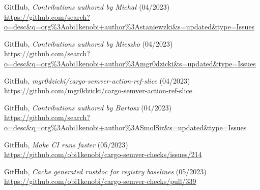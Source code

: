 \documentclass[licencjacka,en]{pracamgr}
\begin{document}
\begin{thebibliography}{99}
 GitHub,
	\textit{Contributions authored by Michał} (04/2023) \\
	\url{https://github.com/search?o=desc&q=org%3Aobi1kenobi+author%3Astaniewzki&s=updated&type=Issues}

 GitHub,
	\textit{Contributions authored by Mieszko} (04/2023) \\
	\url{https://github.com/search?o=desc&q=org%3Aobi1kenobi+author%3Amgr0dzicki&s=updated&type=Issues}

 GitHub,
	\textit{mgr0dzicki/cargo-semver-action-ref-slice} (04/2023) \\
	\url{https://github.com/mgr0dzicki/cargo-semver-action-ref-slice}

 GitHub,
	\textit{Contributions authored by Bartosz} (04/2023) \\
	\url{https://github.com/search?o=desc&q=org%3Aobi1kenobi+author%3ASmolSir&s=updated&type=Issues}



 GitHub,
	\textit{Make CI runs faster} (05/2023) \\
	\url{https://github.com/obi1kenobi/cargo-semver-checks/issues/214}

 GitHub,
	\textit{Cache generated rustdoc for registry baselines} (05/2023) \\
	\url{https://github.com/obi1kenobi/cargo-semver-checks/pull/339}

\end{thebibliography}
\end{document}
